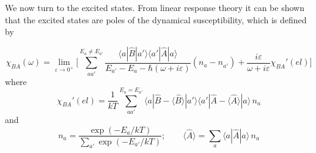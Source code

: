We now turn to the excited states. From linear response theory it can 
be shown~\cite[page 143]{jensen91-1}
that the excited states are poles of the dynamical susceptibility, 
which is defined by

\begin{equation}
\chi_{BA}^{}(\omega)=\lim_{\varepsilon\to0^+}\Bigg[\sum_{aa'}^{E_a\ne E_{a'}}
\frac{\langle a|\hat{B}|a'\rangle\langle a'|\hat{A}|a\rangle}
{E_{a'}-E_a-\hbar(\omega+i\varepsilon)}(n_a^{}-n_{a'}^{})
+\frac{i\varepsilon}{\omega+i\varepsilon}\chi_{BA}'(el)\Bigg]\label{generalsuszeptibility}
\end{equation}
where
\begin{equation}
\chi_{BA}'(el)=\frac{1}{kT}
\sum_{aa'}^{E_a= E_{a'}}\langle a|\hat{B}-\langle \hat{B}\rangle|a'\rangle \langle
a'|\hat{A}-\langle \hat{A}\rangle|a\rangle\,n_a^{}\label{e5}
\end{equation}
and
\begin{equation}
n_a^{}=\frac{\exp(-E_a^{}/kT)}{\sum_{a'}\exp(-E_{a'}/kT)};\qquad
\langle \hat{A}\rangle=\sum_a\langle a|\hat{A}|a\rangle\,n_a^{} \label{e6}
\end{equation}

